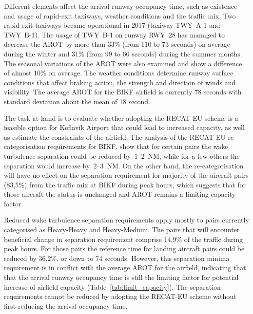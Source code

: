 Different elements affect the arrival runway occupancy time, such as existence and usage of rapid-exit taxiways, weather conditions and the traffic mix. Two rapid-exit taxiways became operational in 2017 (taxiway TWY~A-1 and TWY~B-1). The usage of TWY~B-1 on runway RWY~28 has managed to decrease the AROT by more than 33\% (from 110 to 73 seconds) on average during the winter and 31\% (from 99 to 66 seconds) during the summer months. The seasonal variations of the AROT were also examined and show a difference of almost 10\% on average. The weather conditions determine runway surface conditions that affect braking action, the strength and direction of winds and visibility. The average AROT for the BIKF airfield is currently 78 seconds with standard
deviation about the mean of 18 second.


The task at hand is to evaluate whether adopting the RECAT-EU scheme is a feasible option for Keflavík Airport that could lead to increased capacity, as well as estimate the constraints of the airfield. 
The analysis of the RECAT-EU re-categorisation requirements for BIKF, show that for certain pairs the wake turbulence separation could be reduced by~1--2~NM, while for a few others the separation would increase by~2--3~NM. On the other hand, the re-categorisation will have no effect on the separation requirement for majority of the aircraft pairs (83,5\%) from the traffic mix at BIKF during peak hours, which suggests that for those aircraft the status is unchanged and AROT remains a limiting capacity factor. 

Reduced wake turbulence separation requirements apply mostly to pairs currently categorised as Heavy-Heavy and Heavy-Medium. 
The pairs that will encounter beneficial change in separation requirement comprise 14,9\% of the traffic during peak hours. For those pairs the reference time for landing aircraft pairs could be reduced by 36,2\%, or down to 74 seconds. However, this separation minima requirement is in conflict with the average AROT for the airfield, indicating that that the arrival runway occupancy time is still the limiting factor for potential increase of airfield capacity (Table~\ref{tab:limit_capacity}). The separation requirements cannot be reduced by adopting the RECAT-EU scheme without first reducing the arrival occupancy time.

